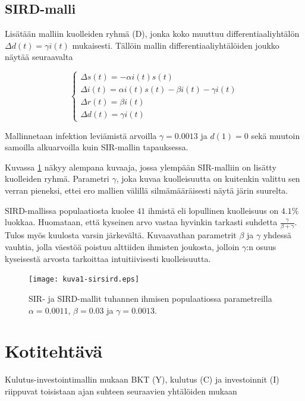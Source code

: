 \documentclass[a4paper,11pt]{article}
\begin{document}
{\subsection{SIRD-malli}

Lisätään malliin kuolleiden ryhmä (D), jonka koko muuttuu differentiaaliyhtälön $\Delta d(t) = \gamma i(t)$ mukaisesti. Tällöin mallin differentiaaliyhtälöiden joukko näytää seuraavalta

\begin{equation}
\begin{cases}
\Delta s(t) = -\alpha i(t) s(t) \\
\Delta i(t) = \alpha i(t) s(t) - \beta i(t) - \gamma i(t) \\
\Delta r(t) = \beta i(t) \\
\Delta d(t) = \gamma i(t)
\end{cases}
\end{equation}

Mallinnetaan infektion leviämistä arvoilla $\gamma = 0.0013$ ja $d(1) = 0$ sekä muutoin samoilla alkuarvoilla kuin SIR-mallin tapauksessa.

Kuvassa \ref{sirsird} näkyy alempana kuvaaja, jossa ylempään SIR-malliin on lisätty kuolleiden ryhmä. Parametri $\gamma$, joka kuvaa kuolleisuutta on kuitenkin valittu sen verran pieneksi, ettei ero mallien välillä silmämääräisesti näytä järin suurelta.

SIRD-mallissa populaatiosta kuolee $41$ ihmistä eli lopullinen kuolleisuus on $4.1\%$ luokkaa. Huomataan, että kyseinen arvo vastaa hyvinkin tarkasti suhdetta $\frac{\gamma}{\beta + \gamma}$. Tulos myös kuulosta varsin järkevältä. Kuvaavathan parametrit $\beta$ ja $\gamma$ yhdessä vauhtia, jolla väestöä poistuu alttiiden ihmisten joukosta, jolloin $\gamma$:n osuus kyseisestä arvosta tarkoittaa intuitiivisesti kuolleisuutta.

\begin{figure}
    \centering
    \texttt{[image: kuva1-sirsird.eps]}
    \caption{SIR- ja SIRD-mallit tuhannen ihmisen populaatiossa parametreilla $\alpha = 0.0011$, $\beta = 0.03$ ja $\gamma = 0.0013$.}
    \label{sirsird}
\end{figure}

\clearpage

\section{Kotitehtävä}

Kulutus-investointimallin mukaan BKT (Y), kulutus (C) ja investoinnit (I) riippuvat toisistaan ajan suhteen seuraavien yhtälöiden mukaan

}
\end{document}
